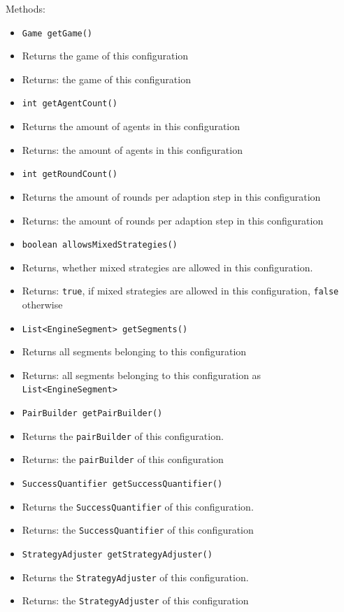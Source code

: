 \documentclass[parskip=full,11pt]{scrartcl}
\begin{document}
Methods:
\begin{itemize}\itemsep -10pt
\item \texttt{Game getGame()}
\item[] Returns the game of this configuration
\item[] Returns: the game of this configuration

\item \texttt{int getAgentCount()}
\item[] Returns the amount of agents in this configuration
\item[] Returns: the amount of agents in this configuration

\item \texttt{int getRoundCount()}
\item[] Returns the amount of rounds per adaption step in this configuration
\item[] Returns: the amount of rounds per adaption step in this configuration

\item \texttt{boolean allowsMixedStrategies()}
\item[] Returns, whether mixed strategies are allowed in this configuration.
\item[] Returns: \texttt{true}, if mixed strategies are allowed in this configuration, \texttt{false} otherwise

\item \texttt{List<EngineSegment> getSegments()}
\item[] Returns all segments belonging to this configuration
\item[] Returns: all segments belonging to this configuration as \texttt{List<EngineSegment>}

\item \texttt{PairBuilder getPairBuilder()}
\item[] Returns the \texttt{pairBuilder} of this configuration.
\item[] Returns: the \texttt{pairBuilder} of this configuration

\item \texttt{SuccessQuantifier getSuccessQuantifier()}
\item[] Returns the \texttt{SuccessQuantifier} of this configuration.
\item[] Returns: the \texttt{SuccessQuantifier} of this configuration

\item \texttt{StrategyAdjuster getStrategyAdjuster()}
\item[] Returns the \texttt{StrategyAdjuster} of this configuration.
\item[] Returns: the \texttt{StrategyAdjuster} of this configuration


\end{itemize}
\end{document}
